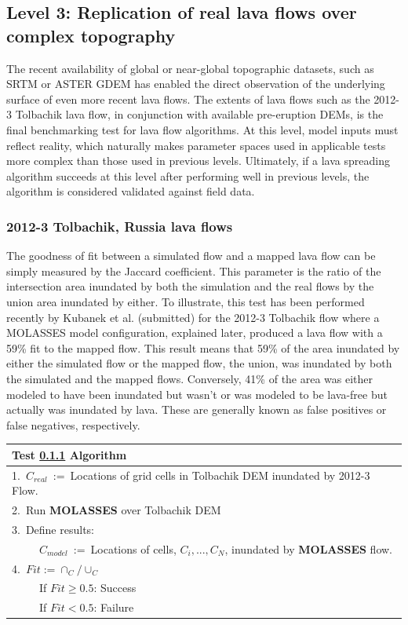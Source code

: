 \documentclass[12pt,letter]{article}
\newcommand{\tabitem}{~~\llap{\textbullet}~~}
\begin{document}
	\subsection{Level 3: Replication of real lava flows over complex topography}
		The recent availability of global or near-global topographic datasets, such as SRTM or ASTER GDEM has enabled the direct observation of the underlying surface of even more recent lava flows. The extents of lava flows such as the 2012-3 Tolbachik lava flow, in conjunction with available pre-eruption DEMs, is the final benchmarking test for lava flow algorithms. At this level, model inputs must reflect reality, which naturally makes parameter spaces used in applicable tests more complex than those used in previous levels. Ultimately, if a lava spreading algorithm succeeds at this level after performing well in previous levels, the algorithm is considered validated against field data.

		\subsubsection{2012-3 Tolbachik, Russia lava flows}\label{test:Real_Tolbachik}
			The goodness of fit between a simulated flow and a mapped lava flow can be simply measured by the Jaccard coefficient. This parameter is the ratio of the intersection area inundated by both the simulation and the real flows by the union area inundated by either. To illustrate, this test has been performed recently by Kubanek et al. (submitted) for the 2012-3 Tolbachik flow where a MOLASSES model configuration, explained later, produced a lava flow with a 59\% fit to the mapped flow. This result means that 59\% of the area inundated by either the simulated flow or the mapped flow, the union, was inundated by both the simulated and the mapped flows. Conversely, 41\% of the area was either modeled to have been inundated but wasn't or was modeled to be lava-free but actually was inundated by lava. These are generally known as false positives or false negatives, respectively.
			

			\begin{center}
				\begin{tabular}{l}
					\toprule
					\textbf{Test \ref{test:Real_Tolbachik} Algorithm}\\
					\midrule
					1.~$C_{real}$~:=~Locations of grid cells in Tolbachik DEM inundated by 2012-3 Flow.\\
					2.~Run \textbf{MOLASSES} over Tolbachik DEM\\
					3.~Define results:\\
						~\tabitem $C_{model}$~:=~Locations of cells, $C_i,...,C_N$, inundated by \textbf{MOLASSES} flow.\\
					4.~$Fit:=\cap_C/\cup_C$\\
						~\tabitem If $Fit\ge0.5$: Success\\
						~\tabitem If $Fit<0.5$: Failure\\
					\bottomrule
				\end{tabular}
			\end{center}
			
\end{document}
